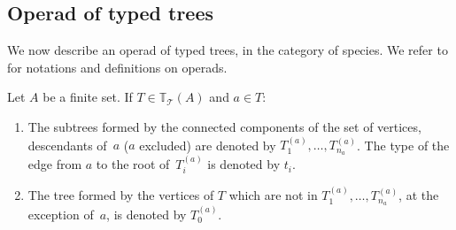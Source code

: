 \documentclass[11pt]{article}
\numberwithin{equation}{section}
\numberwithin{equation}{section}
\newcommand{\T}{\mathcal{T}}
\newcommand{\bfT}{\mathbb{T}}
\begin{document}
\subsection{Operad of typed trees}

We now describe an operad of typed trees, in the category of species.
We refer to \cite{Dotsenko,Vallette,Markl} for notations and definitions on operads.

\begin{Notation} Let $A$ be a finite set. If $T\in \bfT_\T(A)$ and $a\in T$:
\begin{enumerate}\itemsep=0pt
\item The subtrees formed by the connected components of the set of vertices, descendants of~$a$ ($a$ excluded)
are denoted by $T_1^{(a)},\dots,T_{n_a}^{(a)}$.
The type of the edge from $a$ to the root of~$T_i^{(a)}$ is denoted by $t_i$.
\item The tree formed by the vertices of $T$ which are not in $T_1^{(a)},\dots,T_{n_a}^{(a)}$,
at the exception of~$a$, is denoted by $T_0^{(a)}$.
\end{enumerate}
\end{Notation}
\end{document}
